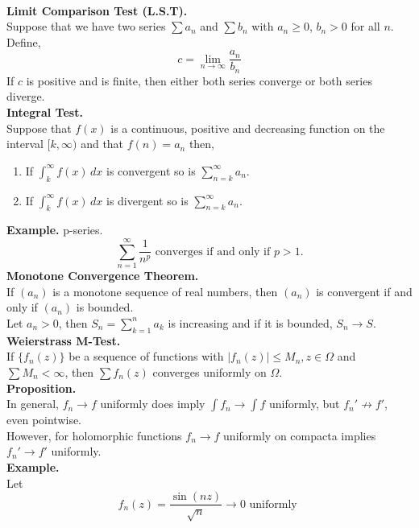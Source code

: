 \documentclass[11pt]{article}
\begin{document}
\  \\
\textbf{Limit Comparison Test (L.S.T).} \\
Suppose that we have two series $\sum {a_n}$ and $\sum {b_n}$ with $a_n \geqslant 0$, $b_n > 0$ for all $n$. Define, 
$$c = \lim_{n \to \infty} \frac{a_n}{b_n} $$
If $c$ is positive and is finite, then either both series converge or both series diverge. \\
\newline
\textbf{Integral Test.} \\
Suppose that $f(x)$ is a continuous, positive and decreasing function on the interval $[k, \infty)$ and that $f(n) = a_n$ then, 
\begin{enumerate}
\item If $\int_k^\infty f(x) \, dx$ is convergent so is $\sum_{n = k}^{\infty} a_n$.
\item If $\int_k^\infty f(x) \, dx$ is divergent so is $\sum_{n = k}^{\infty} a_n$.
\end{enumerate}
\newpage
\textbf{Example.} p-series. 
\begin{equation*}
\sum_{n = 1}^{\infty} \frac{1}{n^p} \mbox{ converges if and only if } p > 1.
\end{equation*}
\newline
\textbf{Monotone Convergence Theorem.} \\
If $(a_n)$ is a monotone sequence of real numbers, then $(a_n)$ is convergent if and only if $(a_n)$ is bounded. \\
Let $a_n > 0$, then $S_n = \sum_{k = 1}^n a_k$ is increasing and if it is bounded, $S_n \to S$. \\
\newline 
\textbf{Weierstrass M-Test.} \\
If $\{f_n(z)\}$ be a sequence of functions with $|f_n(z)| \leqslant M_n, z \in \Omega$ and $\sum {M_n} < \infty$, then $\sum {f_n(z)}$ converges uniformly on $\Omega$. \\
\newline
\textbf{Proposition.} \\
In general, $f_n \to f$ uniformly does imply $\int f_n \to \int f$ uniformly, but $f_n' \nrightarrow f'$, even pointwise. \\
However, for holomorphic functions $f_n \to f$ uniformly on compacta implies $f_n' \to f'$ uniformly. \\
\newline
\textbf{Example.}\\
Let 
\begin{equation*}
f_n(z) = \frac{\sin(nz)}{\sqrt{n}} \to 0 \mbox{ uniformly }
\end{equation*}
\end{document}
